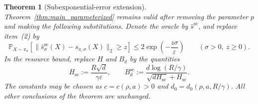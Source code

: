 \documentclass[11pt,letterpaper]{article}
\newtheorem{theorem}{Theorem}[section]
\newcommand{\eps}{\varepsilon}
\newcommand{\1}{\mathbbm{1}}
\newcommand{\Prob}{\mathbb P}
\begin{document}
\begin{theorem}[Subexponential-error extension]
\label{thm:subexponential}
Theorem~\ref{thm:main_parameterized} remains valid after removing the parameter \(p\) and
making the following substitutions.  Denote the oracle by
\(\widehat s^{\mathrm{se}}\), and replace item~\textup{(2)} by
\[
   \Prob_{X\sim\pi_\sigma}\left[
      \|\widehat s^{\mathrm{se}}_\sigma(X)
        -s_{\pi,\sigma}(X)\|_2\ge z
   \right]
   \le 2\exp\left(-\frac{z\sigma}{\eps}\right)
   \qquad(\sigma>0,\ z\ge0).
\]
In the resource bound, replace \(H\) and \(B_d\) by the quantities
\[
   H_{\mathrm{se}}
   :=\frac{R\sqrt d}{\gamma\eps},
   \qquad
   B_d^{\mathrm{se}}
   :=\frac{d\log(R/\gamma)}
   {\sqrt{dH_{\mathrm{se}}}+H_{\mathrm{se}}}.
\]
The constants may be chosen as \(c=c(\rho,a)>0\) and
\(d_0=d_0(\rho,a,R/\gamma)\).
All other conclusions of the theorem are unchanged.
\end{theorem}
\end{document}
